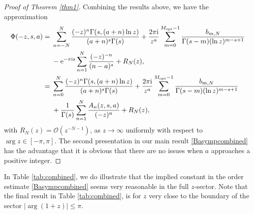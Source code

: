 \documentclass[pdftex]{sigma}
\numberwithin{equation}{section}
\def\expe{{\rm e}}
\def\iunit{{\rm i}}
\def\bigO{{\mathcal O}}
\begin{document}
\begin{proof}[Proof of Theorem \ref{thm1}]
Combining the results above, we have the approximation
\begin{align}
 \Phi(-z,s,a)={}&
 \sum_{n=-N}^N \frac{(-z)^n \Gamma(s,(a+n)\ln z)}{(a+n)^s\Gamma(s)}
 +\frac{2\pi\iunit}{z^{a}}\sum_{m=0}^{M_{\rm opt}-1}
 \frac{b_{m,N}}{\Gamma(s-m)(\ln z)^{m-s+1}}\nonumber\\
 & -\expe^{-\pi\iunit s}\sum_{n=1}^N\frac{(-z)^{-n}}{(n-a)^s}
 +R_N(z),\nonumber\\
 ={}& \sum_{n=0}^N \frac{(-z)^n \Gamma(s,(a+n)\ln z)}{(a+n)^s\Gamma(s)}
 +\frac{2\pi\iunit}{z^{a}}\sum_{m=0}^{M_{\rm opt}-1}
 \frac{b_{m,N}}{\Gamma(s-m)(\ln z)^{m-s+1}}\nonumber\\
 & +\frac1{\Gamma(s)}\sum_{n=1}^N \frac{A_n(z,s,a)}{(-z)^n}+R_N(z),\label{Basympcombined}
\end{align}
with $R_N(z)=\bigO\left(z^{-N-1}\right)$, as $z\to\infty$ uniformly with respect to
$\arg z\in[-\pi,\pi]$. The second presentation in our main result \eqref{Basympcombined} has
the advantage that it is obvious that there are no issues when $a$ approaches a positive integer.
\end{proof}

In Table \ref{tab:combined}, we do illustrate that the implied constant in the order
estimate \eqref{Basympcombined} seems very reasonable in the full $z$-sector.
Note that the final result in Table \ref{tab:combined}, is for $z$ very close to
the boundary of the sector $|\arg(1+z)|\leq\pi$.
\end{document}
